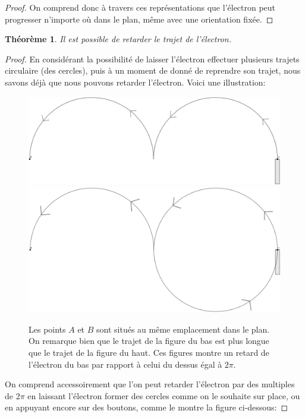 \documentclass[a4paper]{amsart}
\newtheorem{theorem}{Théorème}[section]
\theoremstyle{definition}
\theoremstyle{remark}
\numberwithin{equation}{section}
\begin{document}
\begin{proof}
  On comprend donc à travers ces représentations que l'électron peut progresser n'importe où dans le plan, même avec une orientation fixée.

\end{proof}

\begin{theorem}
  Il est possible de retarder le trajet de l'électron.
\end{theorem}

\begin{proof}
  En considérant la possibilité de laisser l'électron effectuer plusieurs trajets circulaire (des cercles), puis à un moment de donné de reprendre son trajet, nous savons déjà que nous pouvons retarder l'électron. Voici une illustration:

  \begin{figure}[H]
    \centering
    \includegraphics[scale=0.14]{images/not_long.png}
    \includegraphics[scale=0.13]{images/really_long.png}
    \caption{Les points $A$ et $B$ sont situés au même emplacement dans le plan. On remarque bien que le trajet de la figure du bas est plus longue que le trajet de la figure du haut. Ces figures montre un retard de l'électron du bas par rapport à celui du dessus égal à $2\pi$.}
  \end{figure}

  On comprend accessoirement que l'on peut retarder l'électron par des multiples de $2\pi$ en laissant l'électron former des cercles comme on le souhaite sur place, ou en appuyant encore sur des boutons, comme le montre la figure ci-dessous:


\end{proof}
\end{document}
